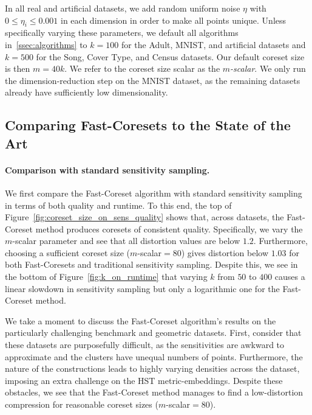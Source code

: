 In all real and artificial datasets, we add random uniform noise $\eta$ with $0 \leq \eta_i \leq 0.001$ in each dimension in order to make all points unique.
Unless specifically varying these parameters, we default all algorithms in~\ref{ssec:algorithms} to $k=100$ for the Adult, MNIST, and artificial datasets and
$k=500$ for the Song, Cover Type, and Census datasets. Our default coreset size is then $m = 40k$. We refer to the coreset size scalar as the \emph{$m$-scalar}.
We only run the dimension-reduction step on the MNIST dataset, as the remaining datasets already have sufficiently low dimensionality.


\subsection{Comparing Fast-Coresets to the State of the Art}
\label{ssec:alg_qualities}


\paragraph*{Comparison with standard sensitivity sampling.}



We first compare the Fast-Coreset algorithm with standard sensitivity sampling in terms of both quality and runtime.  To this end, the top of
Figure~\ref{fig:coreset_size_on_sens_quality} shows that, across datasets, the Fast-Coreset method produces coresets of consistent quality. Specifically, we
vary the $m$-scalar parameter and see that all distortion values are below $1.2$. Furthermore, choosing a sufficient coreset size ($m$-scalar$=80$) gives
distortion below $1.03$ for both Fast-Coresets and traditional sensitivity sampling. Despite this, we see in the bottom of Figure~\ref{fig:k_on_runtime} that
varying $k$ from $50$ to $400$ causes a linear slowdown in sensitivity sampling but only a logarithmic one for the Fast-Coreset method.

We take a moment to discuss the Fast-Coreset algorithm's results on the particularly challenging benchmark and geometric datasets. First, consider that these
datasets are purposefully difficult, as the sensitivities are awkward to approximate and the clusters have unequal numbers of points.
Furthermore, the nature of the constructions leads to highly varying densities across the dataset, imposing an extra challenge on the HST metric-embeddings.
Despite these obstacles, we see that the Fast-Coreset method manages to find a low-distortion compression for reasonable coreset sizes ($m$-scalar$=80$).

